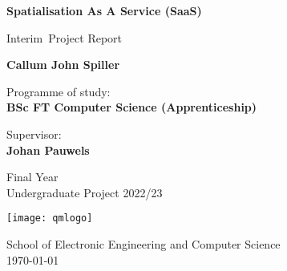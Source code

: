 
\newcommand{\reportversion}{Interim}
\hypersetup{pageanchor=false}
\begin{titlepage}
    \begin{center}
        \vspace*{1cm}

        \huge
        \textbf{Spatialisation As A Service (SaaS)}

        \vspace{0.5cm}

        \large
        \reportversion~Project Report

        \vspace{1.5cm}

        \LARGE
        \textbf{Callum John Spiller}

        \vspace{1.5cm}

        \small
        Programme of study:\\
        \textbf{BSc FT Computer Science (Apprenticeship)}

        \vspace{1cm}

        Supervisor:\\
        \textbf{Johan Pauwels}

        \vfill

        \footnotesize
        Final Year\\
        Undergraduate Project 2022/23

        \vspace{0.5cm}
        \texttt{[image: qmlogo]}
        \vspace{0.5cm}

        School of Electronic Engineering and Computer Science\\
        \today

    \end{center}
\end{titlepage}
